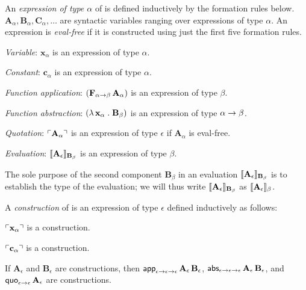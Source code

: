 \documentclass[fleqn]{llncs}
\begin{document}
An \emph{expression of type $\alpha$} of {\churchqe} is defined
inductively by the formation rules below.  $\textbf{A}_\alpha,
\textbf{B}_\alpha, \textbf{C}_\alpha, \ldots$ are syntactic variables
ranging over expressions of type $\alpha$.  An expression is
\emph{eval-free} if it is constructed using just the first five
formation rules.
%
\be

  \item \emph{Variable}: $\textbf{x}_\alpha$ is an expression of type
    $\alpha$.

  \item \emph{Constant}: $\textbf{c}_\alpha$ is an expression of type
    $\alpha$.

  \item \emph{Function application}: $(\textbf{F}_{\alpha \rightarrow
    \beta} \, \textbf{A}_\alpha)$ is an expression of type $\beta$.

  \item \emph{Function abstraction}: $(\lambda\, \textbf{x}_\alpha
    \mathrel. \textbf{B}_\beta)$ is an expression of type $\alpha \rightarrow
    \beta$.

  \item \emph{Quotation}: $\ulcorner\textbf{A}_\alpha\urcorner$ is an
    expression of type $\epsilon$ if $\textbf{A}_\alpha$ is eval-free.

  \item \emph{Evaluation}: $\llbracket\textbf{A}_\epsilon\rrbracket_{{\bf
      B}_\beta}$ is an expression of type $\beta$.

\ee 

\noindent
The sole purpose of the second component $\textbf{B}_\beta$ in an
evaluation $\llbracket\textbf{A}_\epsilon\rrbracket_{{\bf B}_\beta}$ is to
establish the type of the evaluation; we will thus write
$\llbracket\textbf{A}_\epsilon\rrbracket_{{\bf B}_\beta}$ as
$\llbracket\textbf{A}_\epsilon\rrbracket_\beta$.

A \emph{construction} of {\churchqe} is an expression of type
$\epsilon$ defined inductively as follows:

\be

  \item $\ulcorner\textbf{x}_\alpha\urcorner$ is a construction.

  \item $\ulcorner\textbf{c}_\alpha\urcorner$ is a construction.

  \item If $\textbf{A}_\epsilon$ and $\textbf{B}_\epsilon$ are
    constructions, then $\mbox{\sf app}_{\epsilon \rightarrow \epsilon
      \rightarrow \epsilon} \, \textbf{A}_\epsilon \,
    \textbf{B}_\epsilon$, $\mbox{\sf abs}_{\epsilon \rightarrow \epsilon
      \rightarrow \epsilon} \, \textbf{A}_\epsilon \,
    \textbf{B}_\epsilon$, and $\mbox{\sf quo}_{\epsilon \rightarrow \epsilon}
    \, \textbf{A}_\epsilon$ are constructions.
\end{document}
